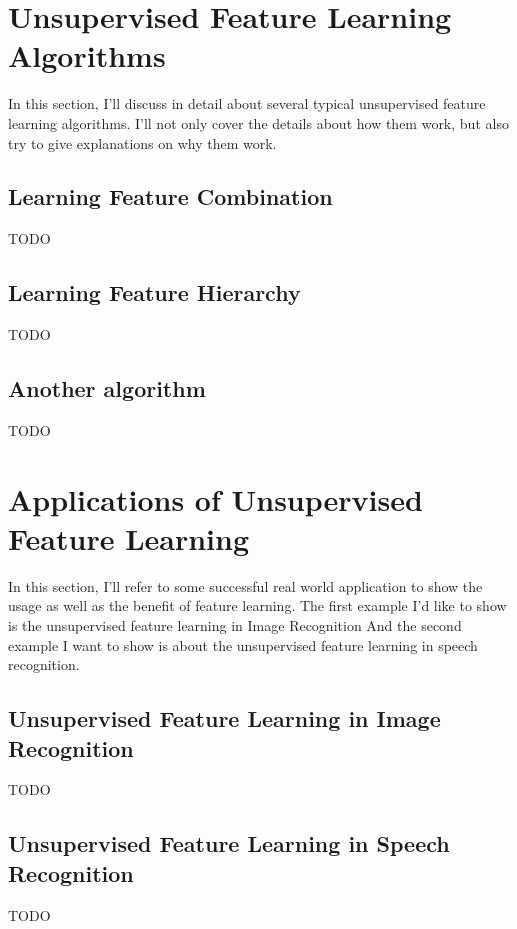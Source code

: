 \documentclass[conference]{IEEEtran}
\begin{document}
\section{Unsupervised Feature Learning Algorithms}

In this section, I'll discuss in detail about several typical unsupervised feature learning algorithms. I'll not only cover the details about how them work, but also try to give explanations on why them work.


\subsection{Learning Feature Combination}

TODO

\subsection{Learning Feature Hierarchy}

TODO

\subsection{Another algorithm}

TODO

\section{Applications of Unsupervised Feature Learning}

In this section, I'll refer to some successful real world application to show the usage as well as the benefit of feature learning. The first example I'd like to show is the unsupervised feature learning in Image Recognition
And the second example I want to show is about the unsupervised feature learning in speech recognition.

\subsection{Unsupervised Feature Learning in Image Recognition}
TODO

\subsection{Unsupervised Feature Learning in Speech Recognition}
TODO
\end{document}
